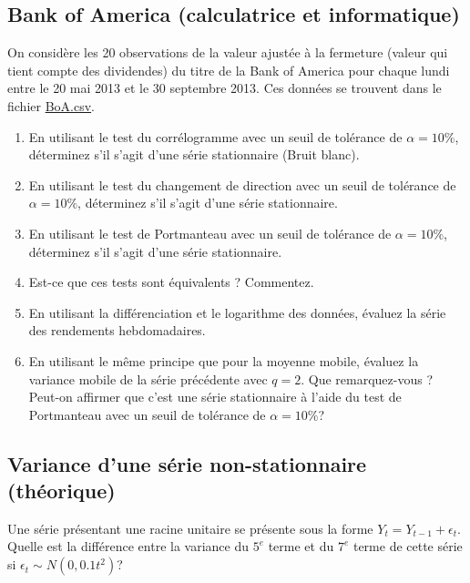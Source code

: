 \documentclass[11pt,english,francais]{article}
\begin{document}
\subsection{Bank of America (calculatrice et informatique)}

On considère les 20 observations de la valeur ajustée à la fermeture (valeur qui tient compte des dividendes) du titre de la Bank of America pour chaque lundi entre le 20 mai 2013 et le 30 septembre 2013. Ces données se trouvent dans le fichier \url{BoA.csv}.

\begin{enumerate}
\item En utilisant le test du corrélogramme avec un seuil de tolérance de $\alpha = 10\%$, déterminez s'il s'agit d'une série stationnaire (Bruit blanc).

\item En utilisant le test du changement de direction avec un seuil de tolérance de $\alpha = 10\%$, déterminez s'il s'agit d'une série stationnaire.

\item En utilisant le test de Portmanteau avec un seuil de tolérance de $\alpha = 10\%$, déterminez s'il s'agit d'une série stationnaire.

\item Est-ce que ces tests sont équivalents ? Commentez.

\item En utilisant la différenciation et le logarithme des données, évaluez la série des rendements hebdomadaires.

\item En utilisant le même principe que pour la moyenne mobile, évaluez la variance mobile de la série précédente avec $q=2$. Que remarquez-vous ? Peut-on affirmer que c'est une série stationnaire à l'aide du test de Portmanteau avec  un seuil de tolérance de $\alpha = 10\%$?
\end{enumerate}

\subsection{Variance d'une série non-stationnaire (théorique)}
\label{sec:variance-dune-serie}

Une série présentant une racine unitaire se présente sous la forme $Y_t = Y_{t-1}+\epsilon_t$. Quelle est la différence entre la variance du $5^e$ terme et du $7^e$ terme de cette série si $\epsilon_t \sim N(0, 0.1t^2)$?

\clearpage


\end{document}
